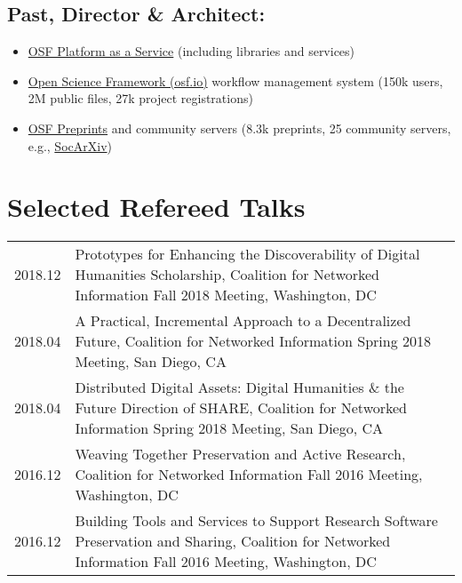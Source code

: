 \documentclass[11pt]{article}
\begin{document}
\subsection{Past, Director \& Architect:}
\begin{itemize}
  \item \href{http://github.com/CenterForOpenScience/}{OSF Platform as a Service} (including libraries and services)
  \item \href{http://osf.io}{Open Science Framework (osf.io)} workflow management system (150k users, 2M public files, 27k project registrations)
  \item \href{http://osf.io/preprints}{OSF Preprints} and community servers (8.3k preprints, 25 community servers, e.g., \href{http://osf.io/preprints/socarxiv}{SocArXiv})
\end{itemize}

\section*{Selected Refereed Talks}
\begin{tabularx}{\textwidth}{lX}
    2018.12 & Prototypes for Enhancing the Discoverability of Digital Humanities Scholarship, Coalition for Networked Information Fall 2018 Meeting, Washington, DC\\
    2018.04 & A Practical, Incremental Approach to a Decentralized Future, Coalition for Networked Information Spring 2018 Meeting, San Diego, CA\\
    2018.04 & Distributed Digital Assets: Digital Humanities \& the Future Direction of SHARE, Coalition for Networked Information Spring 2018 Meeting, San Diego, CA\\
    2016.12    & Weaving Together Preservation and Active Research, Coalition for Networked Information Fall 2016 Meeting, Washington, DC\\
    2016.12    & Building Tools and Services to Support Research Software Preservation and Sharing,  Coalition for Networked Information Fall 2016 Meeting, Washington, DC\\
\end{tabularx}
\end{document}
